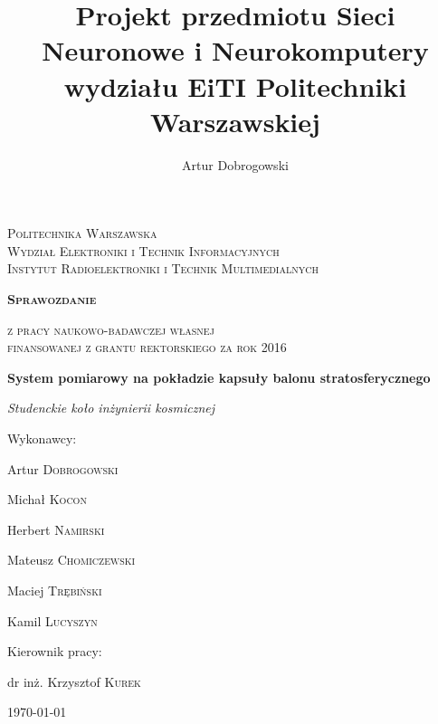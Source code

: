 \documentclass[a4paper,12pt]{article}
\title{Projekt przedmiotu Sieci Neuronowe i Neurokomputery wydziału EiTI Politechniki Warszawskiej}
\author{Artur Dobrogowski}
\begin{document}
\begin{titlepage}
    \centering
    \par\vspace{1cm}
    {\scshape\Large Politechnika Warszawska\\Wydział Elektroniki i Technik Informacyjnych\\Instytut Radioelektroniki i Technik Multimedialnych \par}
    \vspace{1cm}
    {\huge\scshape\bfseries Sprawozdanie\\\par}
    {\scshape\Large z pracy naukowo-badawczej własnej\\ finansowanej z grantu rektorskiego za rok 2016\\\par}
    \vspace{1cm}
    {\Large\bfseries System pomiarowy na pokładzie kapsuły balonu stratosferycznego\\\par}
    \vspace{1cm}
    {\Large\itshape Studenckie koło inżynierii kosmicznej\par}
    \vfill
    Wykonawcy: \par
    {\small
    \begin{multicols}{3}

    \par Artur \textsc{Dobrogowski} 
    \par Michał \textsc{Kocon}
    \par Herbert \textsc{Namirski}
    \par Mateusz \textsc{Chomiczewski}
    \par Maciej \textsc{Trębiński}
    \par Kamil \textsc{Lucyszyn}
    \end{multicols}
}
    Kierownik pracy:\par
    dr inż. Krzysztof \textsc{Kurek}

    \vfill

    {\large \today\par}
\end{titlepage}

\tableofcontents
\end{document}
